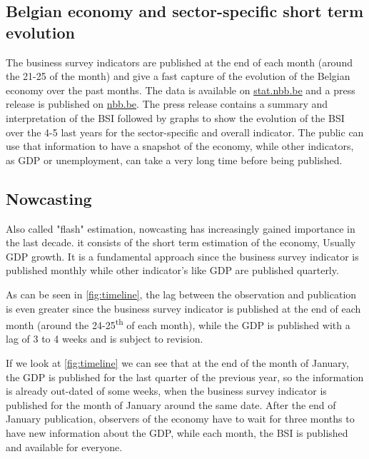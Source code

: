 \documentclass[12pt,a4paper,oneside]{book}
\begin{document}
\subsection{Belgian economy and sector-specific short term evolution}


The business survey indicators are published at the end of each month (around the 21-25 of the month) and give a fast capture of the evolution of the Belgian economy over the past months.
The data is available on \href{http://stat.nbb.be/Index.aspx?DataSetCode=BUSSURVM&Lang=en}{stat.nbb.be} and a press release is published on \href{http://www.nbb.be/doc/dq/e/conj.htm}{nbb.be}. 
The press release contains a summary and interpretation of the BSI followed by graphs to show the evolution of the BSI over the 4-5 last years for the sector-specific and overall indicator.
The public can use that information to have a snapshot of the economy, while other indicators, as GDP or unemployment, can take a very long time before being published.


\subsection{Nowcasting}
\label{sec:nowcasting}

Also called "flash" estimation, nowcasting has increasingly gained importance in the last decade.
it consists of the short term estimation of the economy, Usually GDP growth.
It is a fundamental approach since the business survey indicator is published monthly while other indicator's like GDP are published quarterly.

As can be seen in \autoref{fig:timeline}, 
the lag between the observation and publication is even greater since the business survey indicator is published at the end of each month (around the 24-25\textsuperscript{th} of each month), while the GDP is published with a lag of 3 to 4 weeks and is subject to revision.

If we look at \autoref{fig:timeline} we can see that at the end of the month of January, the GDP is published for the last quarter of the previous year, so the information is already out-dated of some weeks, when the business survey indicator is published for the month of January around the same date. After the end of January publication, observers of the economy have to wait for three months to have new information about the GDP, while each month, the BSI is published and available for everyone.
\end{document}
